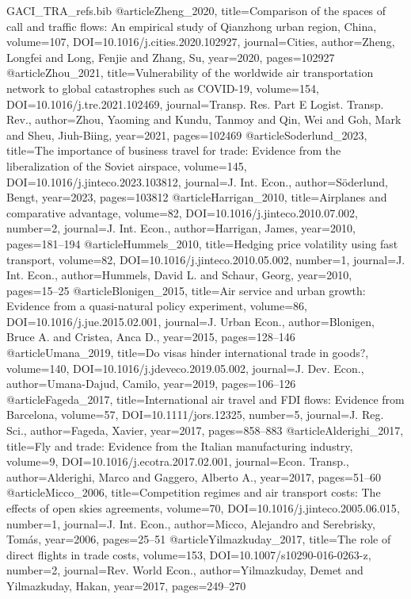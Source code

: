 \begin{filecontents*}[overwrite]{GACI_TRA_refs.bib}
@article{Zheng_2020, title={Comparison of the spaces of call and traffic flows: An empirical study of {Qianzhong} urban region, {China}}, volume={107}, DOI={10.1016/j.cities.2020.102927}, journal={Cities}, author={Zheng, Longfei and Long, Fenjie and Zhang, Su}, year={2020}, pages={102927} }
@article{Zhou_2021, title={Vulnerability of the worldwide air transportation network to global catastrophes such as {COVID-19}}, volume={154}, DOI={10.1016/j.tre.2021.102469}, journal={Transp. Res. Part E Logist. Transp. Rev.}, author={Zhou, Yaoming and Kundu, Tanmoy and Qin, Wei and Goh, Mark and Sheu, Jiuh-Biing}, year={2021}, pages={102469} }
@article{Soderlund_2023, title={The importance of business travel for trade: Evidence from the liberalization of the {Soviet} airspace}, volume={145}, DOI={10.1016/j.jinteco.2023.103812}, journal={J. Int. Econ.}, author={S\"oderlund, Bengt}, year={2023}, pages={103812} }
@article{Harrigan_2010, title={Airplanes and comparative advantage}, volume={82}, DOI={10.1016/j.jinteco.2010.07.002}, number={2}, journal={J. Int. Econ.}, author={Harrigan, James}, year={2010}, pages={181--194} }
@article{Hummels_2010, title={Hedging price volatility using fast transport}, volume={82}, DOI={10.1016/j.jinteco.2010.05.002}, number={1}, journal={J. Int. Econ.}, author={Hummels, David L. and Schaur, Georg}, year={2010}, pages={15--25} }
@article{Blonigen_2015, title={Air service and urban growth: Evidence from a quasi-natural policy experiment}, volume={86}, DOI={10.1016/j.jue.2015.02.001}, journal={J. Urban Econ.}, author={Blonigen, Bruce A. and Cristea, Anca D.}, year={2015}, pages={128--146} }
@article{Umana_2019, title={Do visas hinder international trade in goods?}, volume={140}, DOI={10.1016/j.jdeveco.2019.05.002}, journal={J. Dev. Econ.}, author={Umana-Dajud, Camilo}, year={2019}, pages={106--126} }
@article{Fageda_2017, title={International air travel and FDI flows: Evidence from {Barcelona}}, volume={57}, DOI={10.1111/jors.12325}, number={5}, journal={J. Reg. Sci.}, author={Fageda, Xavier}, year={2017}, pages={858--883} }
@article{Alderighi_2017, title={Fly and trade: Evidence from the {Italian} manufacturing industry}, volume={9}, DOI={10.1016/j.ecotra.2017.02.001}, journal={Econ. Transp.}, author={Alderighi, Marco and Gaggero, Alberto A.}, year={2017}, pages={51--60} }
@article{Micco_2006, title={Competition regimes and air transport costs: The effects of open skies agreements}, volume={70}, DOI={10.1016/j.jinteco.2005.06.015}, number={1}, journal={J. Int. Econ.}, author={Micco, Alejandro and Serebrisky, Tom\'as}, year={2006}, pages={25--51} }
@article{Yilmazkuday_2017, title={The role of direct flights in trade costs}, volume={153}, DOI={10.1007/s10290-016-0263-z}, number={2}, journal={Rev. World Econ.}, author={Yilmazkuday, Demet and Yilmazkuday, Hakan}, year={2017}, pages={249--270} }
\end{filecontents*}

